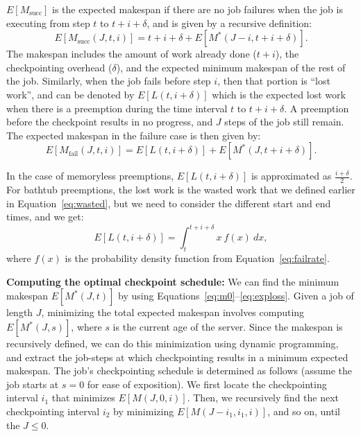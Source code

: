 \documentclass[sigconf]{acmart} %
\begin{document}
$E[M_{\text{succ}}]$ is the expected makespan if there are no job failures when the job is executing from step $t$ to $t+i+\delta$, and is given by a recursive definition:
\begin{equation}
  \label{eq:msuc}
E[M_{\text{succ}}(J, t, i)] = t+i+\delta + E[M^*(J-i, t+i+\delta)].  
\end{equation}
\noindent The makespan includes the amount of work already done ($t+i$), the checkpointing overhead ($\delta$), and the expected minimum makespan of the rest of the job. 
Similarly, when the job fails before step $i$, then that portion is ``lost work'', and can be denoted by $E[L(t, i+\delta)]$ which is the expected lost work when there is a preemption during the time interval $t$ to $t+i+\delta$.
A preemption before the checkpoint results in no progress, and $J$ steps of the job still remain. 
The expected makespan in the failure case is then given by:
\begin{equation}
  \label{eq:mfail}
 E[M_{\text{fail}}(J, t, i)] = E[L(t, i+\delta)] + E[M^*(J, t+i+\delta)].
\end{equation}

In the case of memoryless preemptions, $E[L(t, i+\delta)]$ is approximated as $\frac{i+\delta}{2}$.
For bathtub preemptions, the lost work is the wasted work that we defined earlier in Equation~\ref{eq:wasted}, but we need to consider the different start and end times, and we get:
\begin{equation}
  \label{eq:exploss}
E[L(t, i+\delta)] = \int_{t}^{t+i+\delta}{x~f(x)~dx}   , 
\end{equation}
where $f(x)$ is the probability density function from Equation~\ref{eq:failrate}.

\noindent \textbf{Computing the optimal checkpoint schedule:}
We can find the minimum makespan $E[M^*(J, t)]$ by using Equations~\ref{eq:m0}--\ref{eq:exploss}. 
Given a job of length $J$, minimizing the total expected makespan involves computing $E[M^*(J, s)]$, where $s$ is the current age of the server. 
Since the makespan is recursively defined, we can do this minimization using dynamic programming, and extract the job-steps at which checkpointing results in a minimum expected makespan. 
The job's checkpointing schedule is determined as follows (assume the job starts at $s=0$ for ease of exposition). 
We first locate the checkpointing interval $i_1$ that minimizes $E[M(J,0,i)]$.  
Then, we recursively find the next checkpointing interval $i_2$ by minimizing  $E[M(J-i_1, i_1,i)]$, and so on, until the $J\leq0$. 
\end{document}
